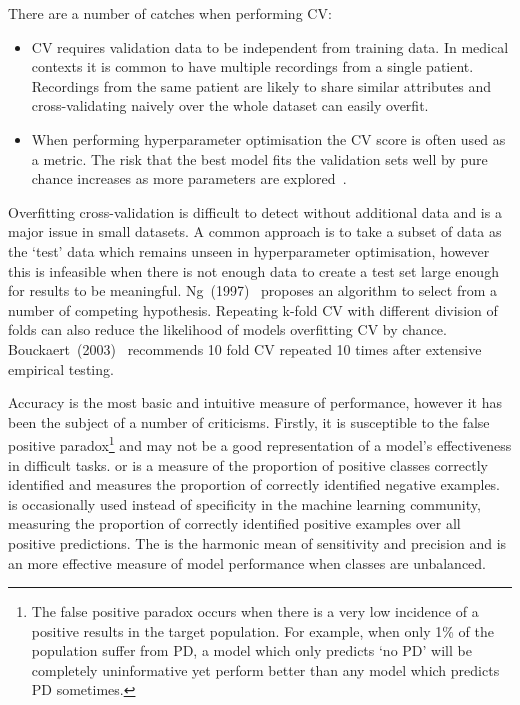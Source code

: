 \documentclass[12pt, twoside]{book}
\renewcommand\emph[1]{\textit{\color{USred}{#1}}}
\begin{document}
There are a number of catches when performing CV:
\begin{itemize}
	\item CV requires validation data to be independent from training data. In medical contexts it is common to have multiple recordings from a single patient. Recordings from the same patient are likely to share similar attributes and cross-validating naively over the whole dataset can easily overfit.
	\item When performing hyperparameter optimisation the CV score is often used as a metric. The risk that the best model fits the validation sets well by pure chance increases as more parameters are explored~\cite{overfittingcv}.
\end{itemize}

Overfitting cross-validation is difficult to detect without additional data and is a major issue in small datasets. A common approach is to take a subset of data as the `test' data which remains unseen in hyperparameter optimisation, however this is infeasible when there is not enough data to create a test set large enough for results to be meaningful. Ng~(1997)~\cite{overfittingcv} proposes an algorithm to select from a number of competing hypothesis. Repeating k-fold CV with different division of folds can also reduce the likelihood of models overfitting CV by chance. Bouckaert~(2003)~\cite{bestcvempirical} recommends 10 fold CV repeated 10 times after extensive empirical testing.

Accuracy is the most basic and intuitive measure of performance, however it has been the subject of a number of criticisms. Firstly, it is susceptible to the false positive paradox\footnote{The false positive paradox occurs when there is a very low incidence of a positive results in the target population. For example, when only 1\% of the population suffer from PD, a model which only predicts `no PD' will be completely uninformative yet perform better than any model which predicts PD sometimes.} and may not be a good representation of a model's effectiveness in difficult tasks. \emph{Sensitivity} or \emph{recall} is a measure of the proportion of positive classes correctly identified and \emph{specificity} measures the proportion of correctly identified negative examples. \emph{Precision} is occasionally used instead of specificity in the machine learning community, measuring the proportion of correctly identified positive examples over all positive predictions. The \emph{$F_1$ score} is the harmonic mean of sensitivity and precision and is an more effective measure of model performance when classes are unbalanced. 
\end{document}
